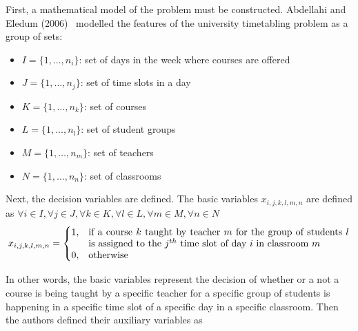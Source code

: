 \documentclass[a4paper, 12pt]{report}
\begin{document}
First, a mathematical model of the problem must be constructed.
Abdellahi and Eledum (2006)~\cite{bip_example} modelled the features of the
university timetabling problem as a group of sets:
\begin{itemize}
	\item
		\begin{math}
			I = \{ 1, \dots , n_i \}
		\end{math}: set of days in the week where courses are offered
	\item
		\begin{math}
			J = \{ 1, \dots , n_j \}
		\end{math}: set of time slots in a day
	\item 
		\begin{math}
			K = \{ 1, \dots , n_k \}
		\end{math}: set of courses
	\item 
		\begin{math}
			L = \{ 1, \dots , n_l \}
		\end{math}: set of student groups
	\item 
		\begin{math}
			M = \{ 1, \dots , n_m \}
		\end{math}: set of teachers
	\item 
		\begin{math}
			N = \{ 1, \dots , n_n \}
		\end{math}: set of classrooms
\end{itemize}

Next, the decision variables are defined. The basic variables
\begin{math}
	x_{i,j,k,l,m,n}
\end{math}
are defined as
\begin{math}
	\forall i \in I, \forall j \in J, \forall k \in K, \forall l \in L, \forall
	m \in M, \forall n \in N
\end{math}
\begin{align*}
	x_{i,j,k,l,m,n} = 
	\begin{cases}
		1, & \parbox[t]{9.5cm}{if a course \( k \) taught by teacher \( m \) for
		the group of students \( l \) is assigned to the \( j^{th} \) time slot 
		of day \( i \) in classroom \( m \)} \\
		0, & \text{otherwise}
	\end{cases}
\end{align*}

In other words, the basic variables represent the decision of whether or a not
a course is being taught by a specific teacher for a specific group of students
is happening in a specific time slot of a specific day in a specific classroom.
Then the authors defined their auxiliary variables as
\end{document}
